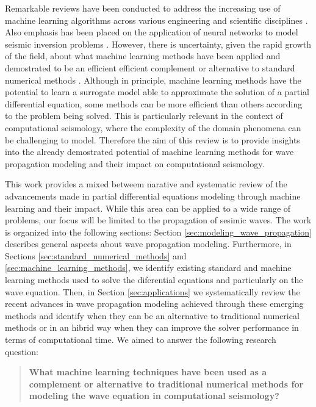 \documentclass[11pt,twoside]{article}
\begin{document}
Remarkable reviews have been conducted to address the increasing use of machine learning algorithms across various 
engineering and scientific disciplines \citep{vadyala_review_2022,deng_physics-informed_2023,lino_current_2023}. 
Also emphasis has been placed on the application of neural networks to model seismic inversion problems 
\citep{jingbo_research_2023}. However, there is uncertainty, given the rapid growth of the field, about what 
machine learning methods have been applied and demostrated to be an efficient efficient complement or alternative 
to standard numerical methods \citep{grossmann_can_2023,mcgreivy_weak_2024}. Although in principle, machine learning 
methods have the potential to learn a surrogate model able to approximate the solution of a partial differential 
equation, some methods can be more efficient than others according to the problem being solved. This is 
particularly relevant in the context of computational seismology, where the complexity of the domain phenomena can 
be challenging to model. Therefore the aim of this review is to provide insights into the already demostrated 
potential of machine learning methods for wave propagation modeling and their impact on computational seismology.

This work provides a mixed betweem narative and systematic review of the advancements made in partial 
differential equations modeling through machine learning and their impact. While this area can be applied to 
a wide range of problems, our focus will be limited to the propagation of sesimic waves. The work is 
organized into the following sections: Section \ref{sec:modeling_wave_propagation} describes general aspects 
about wave propagation modeling. Furthermore, in Sections \ref{sec:standard_numerical_methods} and 
\ref{sec:machine_learning_methods}, we identify existing standard and machine learning methods used to solve 
the diferential equations and particularly on the wave equation. Then, in Section \ref{sec:applications} we 
systematically review the recent advances in wave propagation modeling achieved through these emerging methods 
and identify when they can be an alternative to traditional numerical methods or in an hibrid way when they can 
improve the solver performance in terms of computational time. We aimed to answer the following research question:

\vspace*{2mm}

\begin{tcolorbox}[colback=gray!20, colframe=gray!20, sharp corners]
\begin{quote}
\noindent\textbf{What machine learning techniques have been used as a complement or alternative to traditional 
numerical methods for modeling the wave equation in computational seismology?}
\end{quote}
\end{tcolorbox}
\end{document}
